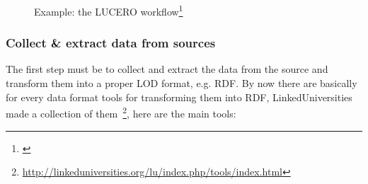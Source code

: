 {\begin{figure}[htbp]
\centering
{}
\caption[Example: the LUCERO workflow]{Example: the LUCERO workflow\footnote{\citet{url:lucero-tabloid}}}
\label{Fi:lucero_architecture}
\end{figure}

\subsubsection{Collect \& extract data from sources}\label{subsubsec:sources}
The first step must be to collect and extract the data from the source and transform them into a proper LOD format, e.g. RDF. By now there are basically for every data format tools for transforming them into RDF, LinkedUniversities made a collection of them~\footnote{\url{http://linkeduniversities.org/lu/index.php/tools/index.html}}, here are the main tools:

}
